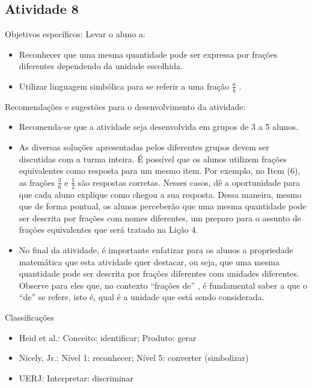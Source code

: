 \documentclass[oneside]{book}
\begin{document}
\begin{multicols}{2}
\subsection{Atividade 8}


  Objetivos específicos: Levar o aluno a:
\begin{itemize} %
    \item       Reconhecer que uma mesma quantidade pode ser expressa por frações diferentes dependendo da unidade escolhida.
    \item       Utilizar linguagem simbólica para se referir a uma fração       $\frac{a}{b}$      .
\end{itemize} %


  Recomendações e sugestões para o desenvolvimento da atividade:
\begin{itemize} %
    \item       Recomenda-se que a atividade seja desenvolvida em grupos de 3 a 5 alunos.
    \item       As diversas soluções apresentadas pelos diferentes grupos devem ser discutidas com a turma inteira. É possível que os alunos utilizem frações equivalentes como resposta para um mesmo item. Por exemplo, no Item (6), as frações       $\frac{3}{6}$       e       $\frac{1}{2}$       são respostas corretas. Nesses casos, dê a oportunidade para que cada aluno explique como chegou a sua resposta. Dessa maneira, mesmo que de forma pontual, os alunos perceberão que uma mesma quantidade pode ser descrita por frações com nomes diferentes, um preparo para o assunto de frações equivalentes que será tratado na Lição 4.
    \item       No final da atividade, é importante enfatizar para os alunos a propriedade matemática que esta atividade quer destacar, ou seja, que uma mesma quantidade pode ser descrita por frações diferentes com unidades diferentes. Observe para eles que, no contexto       ``frações de''      , é fundamental saber a que o       ``de''       se refere, isto é, qual é a unidade que está sendo considerada.
\end{itemize} %


  Classificações
\begin{itemize} %
    \item       Heid et al.: Conceito: identificar; Produto: gerar
    \item       Nicely, Jr.: Nível 1: reconhecer; Nível 5: converter (simbolizar)
    \item       UERJ: Interpretar: discriminar
\end{itemize} %




\end{multicols}
\end{document}
